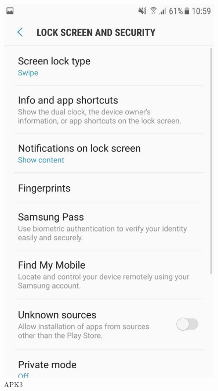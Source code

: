 \begin{figure}[h!]
\begin{minipage}[t]{0.48\textwidth}
\includegraphics[width=\linewidth,keepaspectratio=true]{img/apk3.jpg}
\caption{APK3}
\label{fig:APK3}
\end{minipage}
\hspace*{\fill} %
\begin{minipage}[t]{0.48\textwidth}

\end{minipage}
\end{figure}
